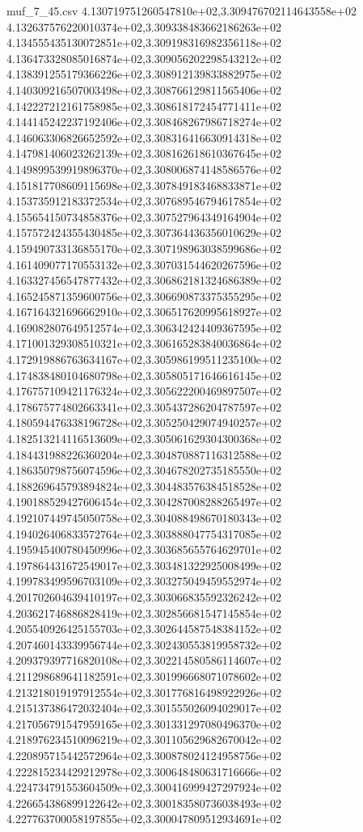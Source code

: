 \begin{filecontents*}{muf_7_45.csv}
4.130719751260547810e+02,3.309476702114643558e+02
4.132637576220010374e+02,3.309338483662186263e+02
4.134555435130072851e+02,3.309198316982356118e+02
4.136473328085016874e+02,3.309056202298543212e+02
4.138391255179366226e+02,3.308912139833882975e+02
4.140309216507003498e+02,3.308766129811565406e+02
4.142227212161758985e+02,3.308618172454771411e+02
4.144145242237192406e+02,3.308468267986718274e+02
4.146063306826652592e+02,3.308316416630914318e+02
4.147981406023262139e+02,3.308162618610367645e+02
4.149899539919896370e+02,3.308006874148586576e+02
4.151817708609115698e+02,3.307849183468833871e+02
4.153735912183372534e+02,3.307689546794617854e+02
4.155654150734858376e+02,3.307527964349164904e+02
4.157572424355430485e+02,3.307364436356010629e+02
4.159490733136855170e+02,3.307198963038599686e+02
4.161409077170553132e+02,3.307031544620267596e+02
4.163327456547877432e+02,3.306862181324686389e+02
4.165245871359600756e+02,3.306690873375355295e+02
4.167164321696662910e+02,3.306517620995618927e+02
4.169082807649512574e+02,3.306342424409367595e+02
4.171001329308510321e+02,3.306165283840036864e+02
4.172919886763634167e+02,3.305986199511235100e+02
4.174838480104680798e+02,3.305805171646616145e+02
4.176757109421176324e+02,3.305622200469897507e+02
4.178675774802663341e+02,3.305437286204787597e+02
4.180594476338196728e+02,3.305250429074940257e+02
4.182513214116513609e+02,3.305061629304300368e+02
4.184431988226360204e+02,3.304870887116312588e+02
4.186350798756074596e+02,3.304678202735185550e+02
4.188269645793894824e+02,3.304483576384518528e+02
4.190188529427606454e+02,3.304287008288265497e+02
4.192107449745050758e+02,3.304088498670180343e+02
4.194026406833572764e+02,3.303888047754317085e+02
4.195945400780450996e+02,3.303685655764629701e+02
4.197864431672549017e+02,3.303481322925008499e+02
4.199783499596703109e+02,3.303275049459552974e+02
4.201702604639410197e+02,3.303066835592326242e+02
4.203621746886828419e+02,3.302856681547145854e+02
4.205540926425155703e+02,3.302644587548384152e+02
4.207460143339956744e+02,3.302430553819958732e+02
4.209379397716820108e+02,3.302214580586114607e+02
4.211298689641182591e+02,3.301996668071078602e+02
4.213218019197912554e+02,3.301776816498922926e+02
4.215137386472032404e+02,3.301555026094029017e+02
4.217056791547959165e+02,3.301331297080496370e+02
4.218976234510096219e+02,3.301105629682670042e+02
4.220895715442572964e+02,3.300878024124958756e+02
4.222815234429212978e+02,3.300648480631716666e+02
4.224734791553604509e+02,3.300416999427297924e+02
4.226654386899122642e+02,3.300183580736038493e+02
4.227763700058197855e+02,3.300047809512934691e+02

\end{filecontents*}
